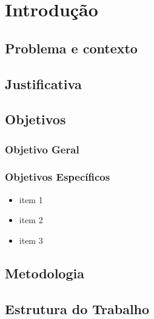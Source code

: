 \chapter{Introdução}
\label{cap:introducao}

\section{Problema e contexto}


\section{Justificativa}


\section{Objetivos}

\subsection{Objetivo Geral}


\subsection{Objetivos Específicos}
\begin{itemize}
\item item 1
\item item 2
\item item 3
\end{itemize}

\section{Metodologia}


\section{Estrutura do Trabalho}

